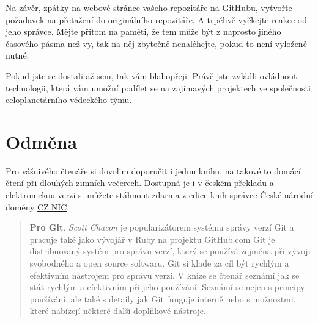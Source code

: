 \documentclass{report}
\begin{document}
Na závěr, zpátky na webové stránce vašeho repozitáře na GitHubu,
vytvořte požadavek na přetažení do originálního repozitáře. A trpělivě
vyčkejte reakce od jeho správce. Mějte přitom na paměti, že tem může být
z naprosto jiného časového pásma než vy, tak na něj zbytečně
nenaléhejte, pokud to není vyloženě nutné.

Pokud jste se dostali až sem, tak vám blahopřeji. Právě jste zvládli
ovládnout technologii, která vám umožní podílet se na zajímavých
projektech ve společnosti celoplanetárního vědeckého týmu.

    \section*{Odměna}\label{odmux11bna}

Pro vášnivého čtenáře si dovolim doporučit i jednu knihu, na takové to
domácí čtení při dlouhých zimních večerech. Dostupná je i v českém
překladu a elektronickou verzi si můžete stáhnout zdarma z edice knih
správce České národní domény \href{https://knihy.nic.cz/}{CZ.NIC}.

\begin{quote}
 \textbf{Pro Git}. \emph{Scott Chacon} je popularizátorem systému správy
verzí Git a pracuje také jako vývojář v Ruby na projektu GitHub.com Git
je distribuovaný systém pro správu verzí, který se používá zejména při
vývoji svobodného a open source softwaru. Git si klade za cíl být
rychlým a efektivním nástrojem pro správu verzí. V knize se čtenář
seznámí jak se stát rychlým a efektivním při jeho používání. Seznámí se
nejen s principy používání, ale také s detaily jak Git funguje interně
nebo s možnostmi, které nabízejí některé další doplňkové nástroje.
\end{quote}


    
    
    
    
\end{document}
